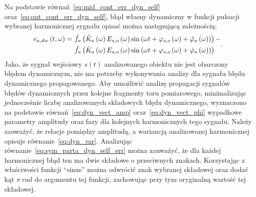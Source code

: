 Na podstawie równań~\eqref{eq:mid_cont_err_dyn_self} oraz~\eqref{eq:out_cont_err_dyn_self}, błąd własny dynamiczny w funkcji pulsacji wybranej harmonicznej sygnału opisać można następującą zależnością:
\begin{equation}
\begin{split}
e_{a,dw} \left(t,\omega\right) =~
& \tilde{f}_{a} \left(\tilde{K}_{a} \left(\omega\right) E_{s,o} \left(\omega\right) \sin \left( \omega t + \varphi_{s,o} \left(\omega\right) + \tilde{\varphi}_{a} \left(\omega\right) \right)\right) - \\
& \tilde{f}_{a} \left(\dot{K}_{a} \left(\omega\right) E_{s,o} \left(\omega\right) \sin \left( \omega t + \varphi_{s,o} \left(\omega\right) + \dot{\varphi}_{a} \left(\omega\right) \right)\right)
\end{split}
\label{eq:sym_parta_dyn_self_err}.
\end{equation}
Jako, że sygnał wejściowy $s(t)$ analizowanego obiektu nie jest obarczony błędem dynamicznym, nie ma potrzeby wykonywania analizy dla sygnału błędu dynamicznego propagowanego. Aby umożliwić analizę propagacji sygnałów błędów dynamicznych przez kolejne fragmenty toru pomiarowego, minimalizując jednocześnie liczbę analizowanych składowych błędu dynamicznego, wyznaczono na podstawie równań~\eqref{eq:dyn_vect_amp} oraz~\eqref{eq:dyn_vect_phi} wypadkowe parametry amplitudy oraz fazy dla kolejnych harmonicznych tego sygnału. Należy zauważyć, że relacje pomiędzy amplitudą, a wariancją analizowanej harmonicznej opisuje równanie~\eqref{eq:dyn_var}. Analizując równanie~\eqref{eq:sym_parta_dyn_self_err} można zauważyć, że dla każdej harmonicznej błąd ten ma dwie składowe o przeciwnych znakach. Korzystając z właściwości funkcji \enquote{sinus} można odwrócić znak wybranej składowej oraz dodać kąt $\pi~\unit{rad}$ do argumentu tej funkcji, zachowując przy tym oryginalną wartość tej składowej.

